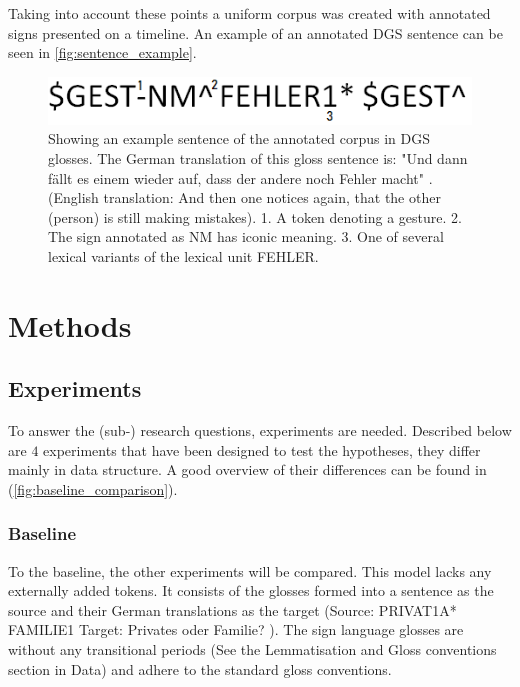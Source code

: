 Taking into account these points a uniform corpus was created with annotated signs presented on a timeline. An example of an annotated DGS sentence can be seen in \autoref{fig:sentence_example}.

\begin{figure}[h]
\caption{Showing an example sentence of the annotated corpus in DGS glosses. The German translation of this gloss sentence is: "Und dann fällt es einem wieder auf, dass der andere noch Fehler macht" \cite{dgscorpus_3}. (English translation: And then one notices again, that the other (person) is still making mistakes). 1. A token denoting a gesture. 2. The sign annotated as NM has iconic meaning. 3. One of several lexical variants of the lexical unit FEHLER.}
 \centering 
 \includegraphics[width=14cm]{Bachelor CSAI thesis template/images/sentence_example.png}
 
 \label{fig:sentence_example}
\end{figure}

\section{Methods}

\subsection{Experiments}

To answer the (sub-) research questions, experiments are needed. Described below are $4$ experiments that have been designed to test the hypotheses, they differ mainly in data structure. A good overview of their differences can be found in (\autoref{fig:baseline_comparison}). 

\subsubsection{Baseline}

To the baseline, the other experiments will be compared. This model lacks any externally added tokens. It consists of the glosses formed into a sentence as the source and their German translations as the target (Source: PRIVAT1A* FAMILIE1 Target: Privates oder Familie? \cite{dgscorpus_3}). The sign language glosses are without any transitional periods (See the Lemmatisation and Gloss conventions section in Data) and adhere to the standard gloss conventions.


